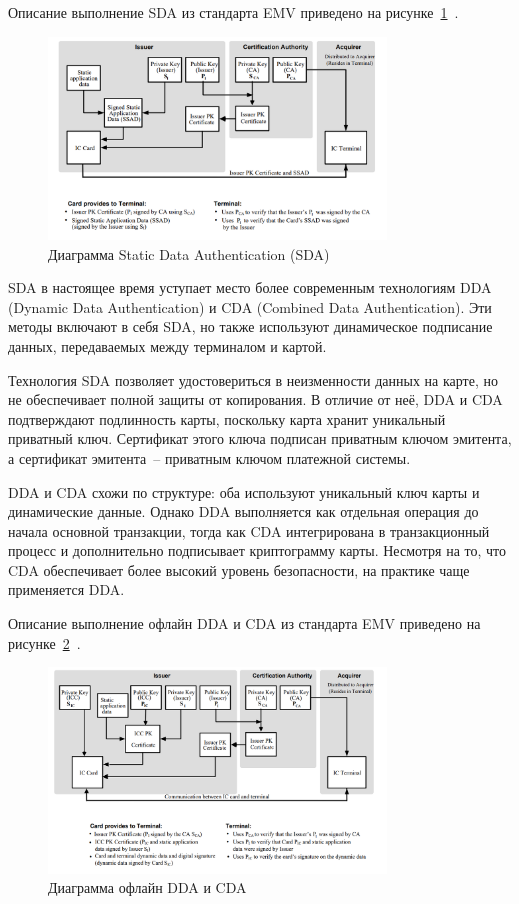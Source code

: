 Описание выполнение SDA из стандарта EMV приведено на рисунке~\ref{fig:emv_offline_sda}~\cite{emv_book_2}.

\begin{figure}[H]
    \centering
    \includegraphics[width=0.8\textwidth]{images/research/emv_offline_sda}
    \caption{\centering Диаграмма Static Data Authentication (SDA)}
    \label{fig:emv_offline_sda}
\end{figure}

SDA в настоящее время уступает место более современным технологиям DDA (Dynamic Data Authentication) и CDA (Combined Data Authentication).
Эти методы включают в себя SDA, но также используют динамическое подписание данных, передаваемых между терминалом и картой.

Технология SDA позволяет удостовериться в неизменности данных на карте, но не обеспечивает полной защиты от копирования.
В отличие от неё, DDA и CDA подтверждают подлинность карты, поскольку карта хранит уникальный приватный ключ.
Сертификат этого ключа подписан приватным ключом эмитента, а сертификат эмитента~-- приватным ключом платежной системы.

DDA и CDA схожи по структуре: оба используют уникальный ключ карты и динамические данные.
Однако DDA выполняется как отдельная операция до начала основной транзакции, тогда как CDA интегрирована в транзакционный процесс и дополнительно подписывает криптограмму карты.
Несмотря на то, что CDA обеспечивает более высокий уровень безопасности, на практике чаще применяется DDA.

Описание выполнение офлайн DDA и CDA из стандарта EMV приведено на рисунке~\ref{fig:emv_offline_dda_cda}~\cite{emv_book_2}.

\begin{figure}[H]
    \centering
    \includegraphics[width=0.8\textwidth]{images/research/emv_offline_dda_cda}
    \caption{\centering Диаграмма офлайн DDA и CDA}
    \label{fig:emv_offline_dda_cda}
\end{figure}

